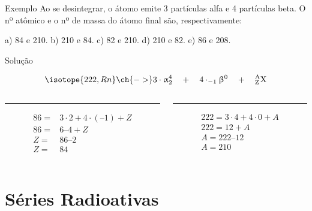 \documentclass[presentation,professionalfonts,aspectratio=169]{beamer}
\begin{document}
\begin{frame}[label={sec:org8451eb1}]{}
\vspace{-1cm}
\begin{question}{Exemplo}
\small
Ao se desintegrar, o átomo  emite 3 partículas alfa e 4 partículas beta. O nº atômico e o nº de massa do átomo final são, respectivamente:

a) 84 e 210. \qquad     b) 210 e 84.  \qquad    c) 82 e 210. \qquad    d) 210 e 82. \qquad    e) 86 e 208.

\begin{myrule}{Solução}


\begin{align*}
\isotope{222,Rn} \ch{->} 3 \cdot  \upalpha_2^4 \quad  +  \quad 4 \cdot_{-1}\upbeta^0 \quad + \quad  \rm{}_Z^AX
\end{align*}

\begin{columns}[T] %
\begin{column}{.48\textwidth}
\color{red}\rule{\linewidth}{4pt}

\begin{align*}
	86 = & 3 \cdot 2 + 4 \cdot (– 1) + Z \\
	86 = & 6 – 4 + Z \\
	Z = & 86 – 2 \\
	Z = & 84
\end{align*}

\end{column}%
\hfill%
\begin{column}{.48\textwidth}
\color{blue}\rule{\linewidth}{4pt}

\begin{align*}
222 = 3 \cdot 4 + 4\cdot 0 + A \\
222 = 12 + A \\
A = 222 – 12 \\ 
A = 210 \\ 
\end{align*}
\end{column}%
\end{columns}
\end{myrule}
\end{question}
\end{frame}





\section{Séries Radioativas}
\label{sec:org2452dae}
\end{document}
